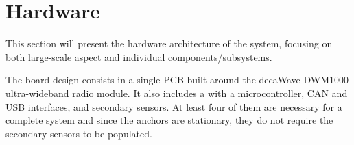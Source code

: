 \section{Hardware}\label{sec:hardware}

This section will present the hardware architecture of the system, focusing on both large-scale aspect and individual components/subsystems.

The board design consists in a single PCB built around the decaWave DWM1000 ultra-wideband radio module.
It also includes a with a microcontroller, CAN and USB interfaces, and secondary sensors.
At least four of them are necessary for a complete system and since the anchors are stationary, they do not require the secondary sensors to be populated.










